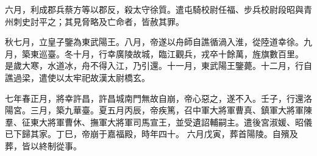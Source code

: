 \begin{pinyinscope}
六月，利成郡兵蔡方等以郡反，殺太守徐質。遣屯騎校尉任福、步兵校尉段昭與青州刺史討平之；其見脅略及亡命者，皆赦其罪。


秋七月，立皇子鑒為東武陽王。八月，帝遂以舟師自譙循渦入淮，從陸道幸徐。九月，築東巡臺。冬十月，行幸廣陵故城，臨江觀兵，戎卒十餘萬，旌旗數百里。
是歲大寒，水道冰，舟不得入江，乃引還。十一月，東武陽王鑒薨。十二月，行自譙過梁，遣使以太牢祀故漢太尉橋玄。


七年春正月，將幸許昌，許昌城南門無故自崩，帝心惡之，遂不入。壬子，行還洛陽宮。三月，築九華臺。夏五月丙辰，帝疾篤，召中軍大將軍曹真、鎮軍大將軍陳羣、征東大將軍曹休、撫軍大將軍司馬宣王，並受遺詔輔嗣主。遣後宮淑媛、昭儀已下歸其家。丁巳，帝崩于嘉福殿，時年四十。
六月戊寅，葬首陽陵。自殯及葬，皆以終制從事。

\end{pinyinscope}
